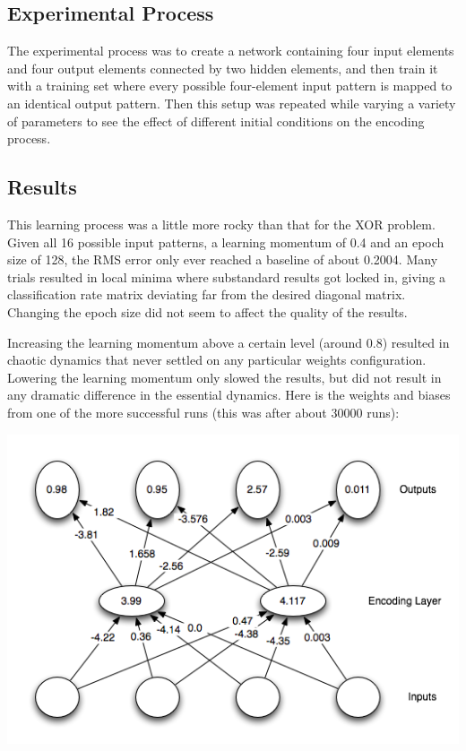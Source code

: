 \documentclass[12pt]{article}
\begin{document}
\subsection{Experimental Process}

The experimental process was to create a network containing four input elements and four output elements connected by two hidden elements, and then train it with a training set where every possible four-element input pattern is mapped to an identical output pattern.  Then this setup was repeated while varying a variety of parameters to see the effect of different initial conditions on the encoding process.  

\subsection{Results}

This learning process was a little more rocky than that for the XOR problem.  Given all 16 possible input patterns, a learning momentum of 0.4 and an epoch size of 128, the RMS error only ever reached a baseline of about 0.2004.  Many trials resulted in local minima where substandard results got locked in, giving a classification rate matrix deviating far from the desired diagonal matrix.  Changing the epoch size did not seem to affect the quality of the results.  

Increasing the learning momentum above a certain level (around 0.8) resulted in chaotic dynamics that never settled on any particular weights configuration.  Lowering the learning momentum only slowed the results, but did not result in any dramatic difference in the essential dynamics.  Here is the weights and biases from one of the more successful runs (this was after about 30000 runs):

\includegraphics[scale=0.8]{encoding.png}
\end{document}
